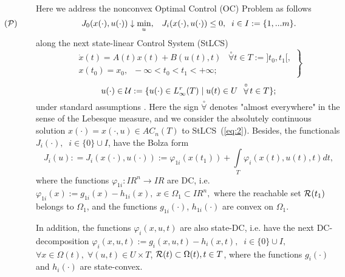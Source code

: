 \documentclass[12pt]{llncs}
\begin{document}
Here we address the nonconvex Optimal Control (OC) Problem as follows
\begin{equation}\label{eq:1}
   \lefteqn{\hspace{-3.20cm}({\cal P})}
 J_0 (x(\cdot),u(\cdot)) \downarrow \min\limits_u, \;\;\; 
 J_i (x(\cdot),u(\cdot)) \leq 0, \;\; i\in I:=\{1,...m\}.
\end{equation}
along the next state-linear Control System (StLCS)
\begin{equation}\label{eq:2}
\left.
  \begin{array}{c}
    \dot{x}(t) = A(t)x(t) + B(u(t),t) \;\;\; \mathop{\forall}\limits^{\circ} t \in T:= ]t_0,t_1[, \\
    x(t_0) = x_0,\;\; -\infty <t_0<t_1< +\infty;
  \end{array}
\right \}
\end{equation}
\begin{equation}\label{eq:3}
  u(\cdot) \in {\cal U} := \{u(\cdot) \in L^r_{\infty}(T) \mid u(t) \in U \;\; \mathop{\forall}\limits^{\circ} t \in T \};
\end{equation}
 under standard assumptions \cite{3ChernAnanResh2008,5KurzhVar2014}.
Here the sign $\mathop{\forall}\limits^{\circ}$ denotes "almost everywhere"$\;$in the sense of the Lebesque measure, and we consider the absolutely continuous solution 
$
x(\cdot)=x(\cdot,u) \in AC_n (T)
$
to StLCS~(\ref{eq:2}). Besides, the functionals $J_i (\cdot),\;\;i \in \{0\} \cup I$, have the Bolza form
\begin{equation}\label{eq:4}
J_i(u): = J_i (x(\cdot),u(\cdot)):=\varphi_{1i}(x(t_1)) + \int\limits_T \varphi_i (x(t),u(t),t) dt,
\end{equation}
where the functions  $\varphi_{1i}: I\!\!R^n \rightarrow I\!\!R$ are DC, i.e.
$ \varphi_{1i}(x):=g_{1i}(x)-h_{1i}(x), \; x \in \Omega_1 \subset I\!\!R^n,$
where the reachable set ${\cal R}(t_1)$ belongs to $\Omega_1$, and the functions $g_{1i}(\cdot)$, $h_{1i}(\cdot)$ are convex on $\Omega_1$.


In addition, the functions $\varphi_i(x,u,t)$ are also state-DC, i.e. have the next DC-decomposition\linebreak
$ \varphi_{i}(x,u,t):=g_{i}(x,u,t)-h_{i}(x,t),\;\; i \in \{0\} \cup I,$
$\forall x \in \Omega(t), \; \forall(u,t) \in U \times T$, ${\cal R}(t) \subset \Omega(t), t \in T$, 
where  the functions $g_i(\cdot)$ and  $h_i(\cdot)$ are state-convex.
\end{document}
